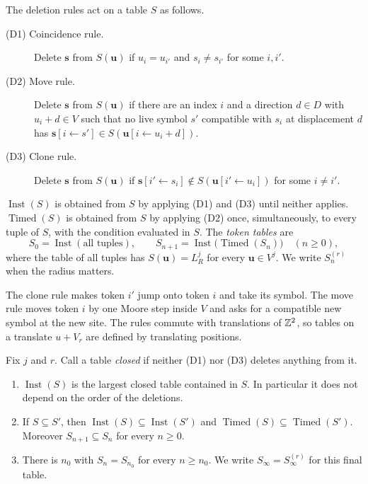 \begin{definition}\label{set:def-tables}
The deletion rules act on a table $S$ as follows.
\begin{description}
\item[(D1) Coincidence rule.] Delete $\mathbf s$ from $S(\mathbf u)$ if $u_i=u_{i'}$ and $s_i\ne s_{i'}$ for some $i,i'$.
\item[(D2) Move rule.] Delete $\mathbf s$ from $S(\mathbf u)$ if there are an index $i$ and a direction $d\in D$ with $u_i+d\in V$ such that no live symbol $s'$ compatible with $s_i$ at displacement $d$ has $\mathbf s[i\leftarrow s']\in S(\mathbf u[i\leftarrow u_i+d])$.
\item[(D3) Clone rule.] Delete $\mathbf s$ from $S(\mathbf u)$ if $\mathbf s[i'\leftarrow s_i]\notin S(\mathbf u[i'\leftarrow u_i])$ for some $i\ne i'$.
\end{description}
$\operatorname{Inst}(S)$ is obtained from $S$ by applying (D1) and (D3) until neither applies. $\operatorname{Timed}(S)$ is obtained from $S$ by applying (D2) once, simultaneously, to every tuple of $S$, with the condition evaluated in $S$. The \emph{token tables} are
\[
S_0=\operatorname{Inst}(\text{all tuples}),\qquad S_{n+1}=\operatorname{Inst}\bigl(\operatorname{Timed}(S_n)\bigr)\quad(n\ge0),
\]
where the table of all tuples has $S(\mathbf u)=L_R^j$ for every $\mathbf u\in V^j$. We write $S^{(r)}_n$ when the radius matters.
\end{definition}

The clone rule makes token $i'$ jump onto token $i$ and take its symbol. The move rule moves token $i$ by one Moore step inside $V$ and asks for a compatible new symbol at the new site. The rules commute with translations of $\mathbb{Z}^2$, so tables on a translate $u+V_r$ are defined by translating positions.

\begin{lemma}\label{set:tables}
Fix $j$ and $r$. Call a table \emph{closed} if neither (D1) nor (D3) deletes anything from it.
\begin{enumerate}
\item[(i)] $\operatorname{Inst}(S)$ is the largest closed table contained in $S$. In particular it does not depend on the order of the deletions.
\item[(ii)] If $S\subseteq S'$, then $\operatorname{Inst}(S)\subseteq\operatorname{Inst}(S')$ and $\operatorname{Timed}(S)\subseteq\operatorname{Timed}(S')$. Moreover $S_{n+1}\subseteq S_n$ for every $n\ge0$.
\item[(iii)] There is $n_0$ with $S_n=S_{n_0}$ for every $n\ge n_0$. We write $S_\infty=S^{(r)}_\infty$ for this final table.
\end{enumerate}
\end{lemma}

